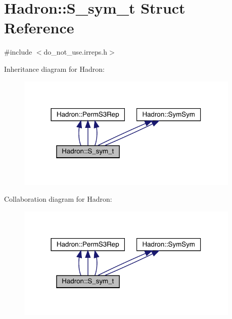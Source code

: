 \hypertarget{structHadron_1_1S__sym__t}{}\section{Hadron\+:\+:S\+\_\+sym\+\_\+t Struct Reference}
\label{structHadron_1_1S__sym__t}


{\ttfamily \#include $<$do\+\_\+not\+\_\+use.\+irreps.\+h$>$}



Inheritance diagram for Hadron\+:
\nopagebreak
\begin{figure}[H]
\begin{center}
\leavevmode
\includegraphics[width=302pt]{de/dee/structHadron_1_1S__sym__t__inherit__graph}
\end{center}
\end{figure}


Collaboration diagram for Hadron\+:
\nopagebreak
\begin{figure}[H]
\begin{center}
\leavevmode
\includegraphics[width=302pt]{d9/d7b/structHadron_1_1S__sym__t__coll__graph}
\end{center}
\end{figure}
